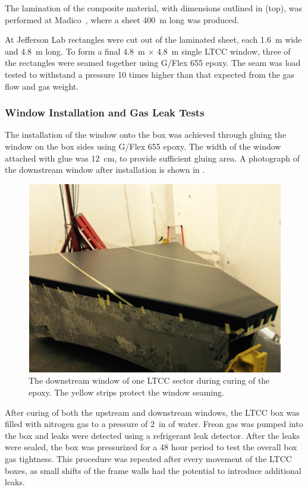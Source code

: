 The lamination of the composite material, with dimensions outlined in  (top), was performed at
Madico~\cite{madico}, where a sheet 400~m long was produced.

At Jefferson Lab rectangles were cut out of the laminated sheet, each 1.6~m wide and 4.8~m long. To form a final
4.8~m $\times$ 4.8~m single LTCC window, three of the rectangles were seamed together using G/Flex 655 epoxy.
The seam was load tested to withstand a pressure 10 times higher than that expected from the gas flow and gas weight.

\subsubsection{Window Installation and Gas Leak Tests}

The installation of the window onto the box was achieved through gluing the window on the box sides using G/Flex 655
epoxy. The width of the window attached with glue was 12~cm, to provide sufficient gluing area. A photograph of the
downstream window after installation is shown in .

\begin{figure}
	\centering
	\includegraphics[width=1.0\columnwidth,keepaspectratio]{img/downstreamWindow.png}
	\caption{The downstream window of one LTCC sector during curing of the epoxy. The yellow strips protect the
          window seaming.}
	\label{fig:downstreamWindow}
\end{figure}

After curing of both the upstream and downstream windows, the LTCC box was filled with nitrogen gas to a pressure of
2~in of water. Freon gas was pumped into the box and leaks were detected using a refrigerant leak detector. After the
leaks were sealed, the box was pressurized for a 48 hour period to test the overall box gas tightness. This procedure
was repeated after every movement of the LTCC boxes, as small shifts of the frame walls had the potential to introduce
additional leaks.
